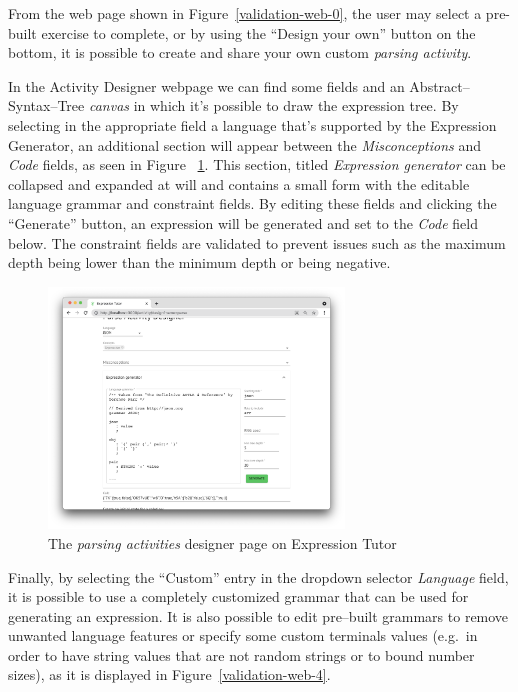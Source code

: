 \documentclass[]{usiinfbachelorproject}
\begin{document}
From the web page shown in Figure~\ref{validation-web-0}, the user may select
a pre-built exercise to complete, or by using the ``Design your own'' button on
the bottom, it is possible to create and share your own custom
\textit{parsing activity}.

In the Activity Designer webpage we can find some fields and an
Abstract–Syntax–Tree \textit{canvas} in which it's possible to draw the
expression tree.
By selecting in the appropriate field a language that's supported by the
Expression Generator, an additional section will appear between the
\textit{Misconceptions} and \textit{Code} fields, as seen in Figure
~\ref{validation-web-3}. This section, titled \textit{Expression generator}
can be collapsed and expanded at will and contains a small form with the
editable language grammar and constraint fields. By editing these fields and
clicking the ``Generate'' button, an expression will be generated and set to
the \textit{Code} field below. The constraint fields are validated to prevent
issues such as the maximum depth being lower than the minimum depth or being
negative.

\begin{figure}[ht]
\centering
\includegraphics[width=0.7\textwidth]{img/validation/web_tutor_step3.png}
\caption{The \textit{parsing activities} designer page on Expression Tutor
}\label{validation-web-3}
\end{figure}

Finally, by selecting the ``Custom'' entry in the dropdown selector
\textit{Language} field, it is possible to use a completely customized grammar
that can be used for generating an expression. It is also possible to edit
pre–built grammars to remove unwanted language features or specify some 
custom terminals values (e.g.\ in order to have string values that are not
random strings or to bound number sizes), as it is displayed in
Figure~\ref{validation-web-4}.
\end{document}
